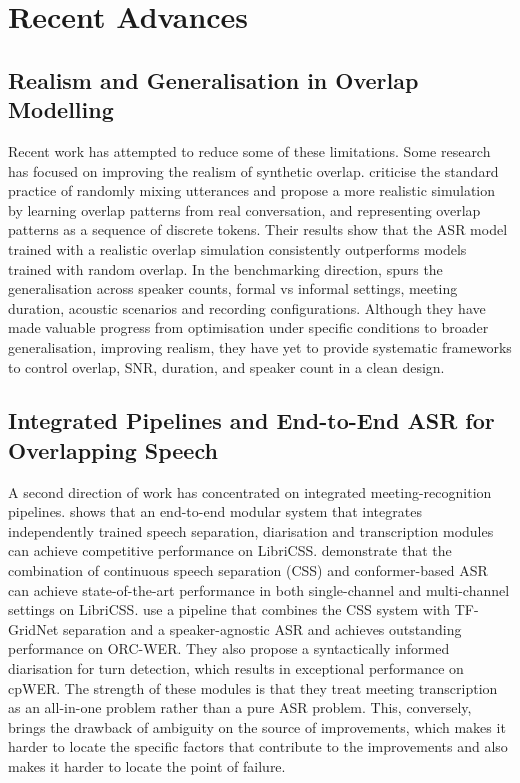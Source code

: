 \section{Recent Advances}
\subsection{Realism and Generalisation in Overlap Modelling}
Recent work has attempted to reduce some of these limitations. Some research has focused on improving the realism of synthetic overlap. \citet{yang2022simulatingrealisticspeechoverlaps} criticise the standard practice of randomly mixing utterances and propose a more realistic simulation by learning overlap patterns from real conversation, and representing overlap patterns as a sequence of discrete tokens. Their results show that the ASR model trained with a realistic overlap simulation consistently outperforms models trained with random overlap. In the benchmarking direction, \citet{cornell2024chime8dasrchallengegeneralizable} spurs the generalisation across speaker counts, formal vs informal settings, meeting duration, acoustic scenarios and recording configurations. Although they have made valuable progress from optimisation under specific conditions to broader generalisation, improving realism, they have yet to provide systematic frameworks to control overlap, SNR, duration, and speaker count in a clean design.

\subsection{Integrated Pipelines and End-to-End ASR for Overlapping Speech}
A second direction of work has concentrated on integrated meeting-recognition pipelines. \cite{raj2020integrationspeechseparationdiarization} shows that an end-to-end modular system that integrates independently trained speech separation, diarisation and transcription modules can achieve competitive performance on LibriCSS. \citet{chen2020continuousspeechseparationconformer} demonstrate that the combination of continuous speech separation (CSS) and conformer-based ASR can achieve state-of-the-art performance in both single-channel and multi-channel settings on LibriCSS. \citet{vonneumann2024meetevaltoolkitcomputationword} use a pipeline that combines the CSS system with TF-GridNet separation and a speaker-agnostic ASR and achieves outstanding performance on ORC-WER. They also propose a syntactically informed diarisation for turn detection, which results in exceptional performance on cpWER. The strength of these modules is that they treat meeting transcription as an all-in-one problem rather than a pure ASR problem. This, conversely, brings the drawback of ambiguity on the source of improvements, which makes it harder to locate the specific factors that contribute to the improvements and also makes it harder to locate the point of failure.

